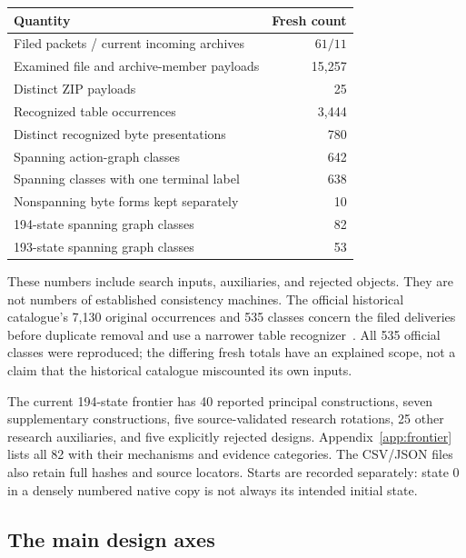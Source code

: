 \documentclass[10pt,letterpaper]{article}
\begin{document}
\begin{center}
\begin{tabular}{@{}lr@{}}
\toprule Quantity & Fresh count\\\midrule
Filed packets / current incoming archives & $61 / 11$\\
Examined file and archive-member payloads & 15,257\\
Distinct ZIP payloads & 25\\
Recognized table occurrences & 3,444\\
Distinct recognized byte presentations & 780\\
Spanning action-graph classes & 642\\
Spanning classes with one terminal label & 638\\
Nonspanning byte forms kept separately & 10\\
194-state spanning graph classes & 82\\
193-state spanning graph classes & 53\\
\bottomrule
\end{tabular}
\end{center}

These numbers include search inputs, auxiliaries, and rejected objects.
They are not numbers of established consistency machines. The official
historical catalogue's 7,130 original occurrences and 535 classes concern
the filed deliveries before duplicate removal and use a narrower table
recognizer~\cite{catalogue}. All 535 official classes were reproduced;
the differing fresh totals have an explained scope, not a claim that the
historical catalogue miscounted its own inputs.

The current 194-state frontier has 40 reported principal constructions,
seven supplementary constructions, five source-validated research
rotations, 25 other research auxiliaries, and five explicitly rejected
designs. Appendix~\ref{app:frontier} lists all 82 with their mechanisms and
evidence categories. The CSV/JSON files also retain full hashes and source
locators. Starts are recorded separately: state 0 in a densely numbered
native copy is not always its intended initial state.

\subsection{The main design axes}
\end{document}
